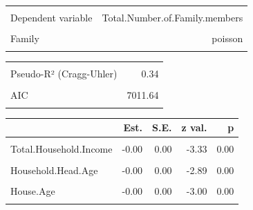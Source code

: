\documentclass[
]{article}
\begin{document}
\begin{table}[!h]
\centering
\begin{tabular}{lr}
\toprule
\cellcolor{gray!6}{Observations} & \cellcolor{gray!6}{1724}\\
Dependent variable & Total.Number.of.Family.members\\
\cellcolor{gray!6}{Type} & \cellcolor{gray!6}{Generalized linear model}\\
Family & poisson\\
\cellcolor{gray!6}{Link} & \cellcolor{gray!6}{log}\\
\bottomrule
\end{tabular}
\end{table} \begin{table}[!h]
\centering
\begin{tabular}{lr}
\toprule
\cellcolor{gray!6}{$\chi^2$(10)} & \cellcolor{gray!6}{693.90}\\
Pseudo-R² (Cragg-Uhler) & 0.34\\
\cellcolor{gray!6}{Pseudo-R² (McFadden)} & \cellcolor{gray!6}{0.09}\\
AIC & 7011.64\\
\cellcolor{gray!6}{BIC} & \cellcolor{gray!6}{7071.61}\\
\bottomrule
\end{tabular}
\end{table} \begin{table}[!h]
\centering
\begin{threeparttable}
\begin{tabular}{lrrrr}
\toprule
  & Est. & S.E. & z val. & p\\
\midrule
\cellcolor{gray!6}{(Intercept)} & \cellcolor{gray!6}{1.43} & \cellcolor{gray!6}{0.08} & \cellcolor{gray!6}{17.90} & \cellcolor{gray!6}{0.00}\\
Total.Household.Income & -0.00 & 0.00 & -3.33 & 0.00\\
\cellcolor{gray!6}{Total.Food.Expenditure} & \cellcolor{gray!6}{0.05} & \cellcolor{gray!6}{0.00} & \cellcolor{gray!6}{14.08} & \cellcolor{gray!6}{0.00}\\
Household.Head.Age & -0.00 & 0.00 & -2.89 & 0.00\\
\cellcolor{gray!6}{House.Floor.Area} & \cellcolor{gray!6}{-0.00} & \cellcolor{gray!6}{0.00} & \cellcolor{gray!6}{-1.51} & \cellcolor{gray!6}{0.13}\\
\addlinespace
House.Age & -0.00 & 0.00 & -3.00 & 0.00\\
\cellcolor{gray!6}{Number.of.bedrooms} & \cellcolor{gray!6}{-0.01} & \cellcolor{gray!6}{0.01} & \cellcolor{gray!6}{-1.53} & \cellcolor{gray!6}{0.13}\\

\end{tabular}
\end{threeparttable}
\end{table}
\end{document}
